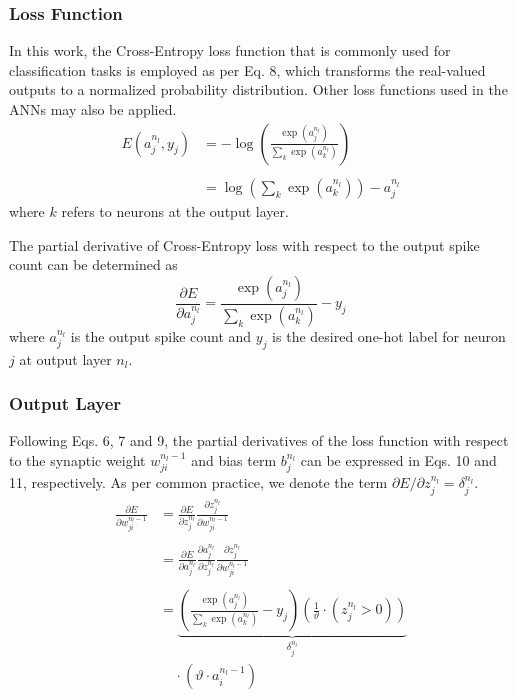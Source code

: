 \documentclass[conference]{IEEEtran}
\begin{document}
\subsubsection{Loss Function}
In this work, the Cross-Entropy loss function that is commonly used for classification tasks is employed as per Eq. 8, which transforms the real-valued outputs to a normalized probability distribution. Other loss functions used in the ANNs may also be applied.
\begin{equation}
\begin{aligned}
E(a_j^{{n_l}},{y_j}) &=  - \log \left( {\frac{{\exp \left( {a_j^{{n_l}}} \right)}}{{\sum\nolimits_k {\exp \left( {a_k^{{n_l}}} \right)} }}}\right)\\
\\&= \log \left( {\sum\nolimits_k {\exp (a_k^{{n_l}})} } \right) - a_j^{{n_l}}
\end{aligned}
\end{equation}
where $k$ refers to neurons at the output layer.

The partial derivative of Cross-Entropy loss with respect to the output spike count can be determined as
\begin{equation}
\frac{{\partial E}}{{\partial a_j^{{n_l}}}} = \frac{{\exp \left( {a_j^{{n_l}}} \right)}}{{\sum\nolimits_k {\exp \left( {a_k^{{n_l}}} \right)} }} - {y_j}
\end{equation}
where $a_j^{n_l}$ is the output spike count and $y_j$ is the desired one-hot label for neuron $j$ at output layer $n_l$.

\subsubsection{Output Layer}
Following Eqs. 6, 7 and 9, the partial derivatives of the loss function with respect to the synaptic weight $w_{ji}^{{n_l} - 1}$ and bias term $b_j^{{n_l}}$ can be expressed in Eqs. 10 and 11, respectively. As per common practice, we denote the term ${\partial E/\partial z_j^{{n_l}}} = \delta _j^{{n_l}}$.
\begin{equation}
\begin{aligned}
\frac{{\partial E}}{{\partial w_{ji}^{{n_l} - 1}}} &= \frac{{\partial E}}{{\partial z_j^{{n_l}}}}\frac{{\partial z_j^{{n_l}}}}{{\partial w_{ji}^{{n_l} - 1}}}\\
\\&= \frac{{\partial E}}{{\partial a_j^{{n_l}}}}\frac{{\partial a_j^{{n_l}}}}{{\partial z_j^{{n_l}}}}\frac{{\partial z_j^{{n_l}}}}{{\partial w_{ji}^{{n_l} - 1}}}\\
\\&= \underbrace {\left( {\frac{{\exp \left( {a_j^{{n_l}}} \right)}}{{\sum\nolimits_k {\exp \left( {a_k^{{n_l}}} \right)} }} - {y_j}} \right)\left( {\frac{1}{\vartheta } \cdot \left( {z_j^{{n_l}} > 0} \right)} \right)}_{\delta _j^{{n_l}}}
\\&\ \ \ \ \ \cdot \left( {\vartheta  \cdot a_i^{{n_l} - 1}} \right)
\end{aligned}
\end{equation}
\end{document}
